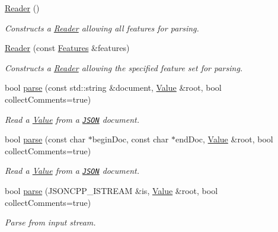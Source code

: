 \begin{DoxyCompactItemize}
\item 
\mbox{\label{classJson_1_1Reader_a0b3c4e24c8393354bab57a6ba3ffc27f}} 
\hyperlink{classJson_1_1Reader_a0b3c4e24c8393354bab57a6ba3ffc27f}{Reader} ()
\begin{DoxyCompactList}\small\item\em Constructs a \hyperlink{classJson_1_1Reader}{Reader} allowing all features for parsing. \end{DoxyCompactList}\item 
\mbox{\label{classJson_1_1Reader_a45f17831118337309180313e93ac33f8}} 
\hyperlink{classJson_1_1Reader_a45f17831118337309180313e93ac33f8}{Reader} (const \hyperlink{classJson_1_1Features}{Features} \&features)
\begin{DoxyCompactList}\small\item\em Constructs a \hyperlink{classJson_1_1Reader}{Reader} allowing the specified feature set for parsing. \end{DoxyCompactList}\item 
bool \hyperlink{classJson_1_1Reader_af1da6c976ad1e96c742804c3853eef94}{parse} (const std\+::string \&document, \hyperlink{classJson_1_1Value}{Value} \&root, bool collect\+Comments=true)
\begin{DoxyCompactList}\small\item\em Read a \hyperlink{classJson_1_1Value}{Value} from a \href{http://www.json.org}{\tt J\+S\+ON} document. \end{DoxyCompactList}\item 
bool \hyperlink{classJson_1_1Reader_ac71ef2b64c7c27b062052e692af3fb32}{parse} (const char $\ast$begin\+Doc, const char $\ast$end\+Doc, \hyperlink{classJson_1_1Value}{Value} \&root, bool collect\+Comments=true)
\begin{DoxyCompactList}\small\item\em Read a \hyperlink{classJson_1_1Value}{Value} from a \href{http://www.json.org}{\tt J\+S\+ON} document. \end{DoxyCompactList}\item 
bool \hyperlink{classJson_1_1Reader_a6d5d0e23f68749d2f17feece4ccf504d}{parse} (J\+S\+O\+N\+C\+P\+P\+\_\+\+I\+S\+T\+R\+E\+AM \&is, \hyperlink{classJson_1_1Value}{Value} \&root, bool collect\+Comments=true)
\begin{DoxyCompactList}\small\item\em Parse from input stream. \end{DoxyCompactList}\item 

\end{DoxyCompactItemize}
